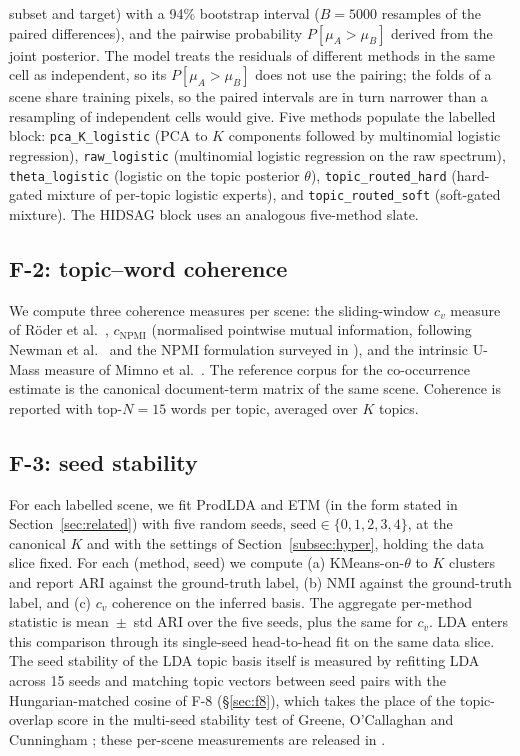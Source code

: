 \documentclass[journal,a4paper,10pt]{IEEEtran}
\begin{document}
subset and target) with a 94\% bootstrap interval ($B = 5000$ resamples
of the paired differences), and the pairwise probability
$P[\mu_A > \mu_B]$ derived from the joint posterior. The model treats
the residuals of different methods in the same cell as independent, so
its $P[\mu_A > \mu_B]$ does not use the pairing; the folds of a scene
share training pixels, so the paired intervals are in turn narrower
than a resampling of independent cells would give. Five methods
populate the labelled block: \texttt{pca\_K\_logistic} (PCA to $K$
components followed by multinomial logistic regression),
\texttt{raw\_logistic} (multinomial logistic regression on the raw
spectrum), \texttt{theta\_logistic} (logistic on the topic posterior
$\theta$), \texttt{topic\_routed\_hard} (hard-gated mixture of
per-topic logistic experts), and \texttt{topic\_routed\_soft}
(soft-gated mixture). The HIDSAG block uses an analogous five-method
slate.

\subsection{F-2: topic--word coherence}

We compute three coherence measures per scene: the sliding-window
$c_v$ measure of Röder et al.\ \cite{roder2015exploring},
$c_{\text{NPMI}}$ (normalised pointwise mutual information,
following Newman et al.\ \cite{newman2010coherence} and the
NPMI formulation surveyed in \cite{roder2015exploring}), and the
intrinsic U-Mass measure of Mimno et al.\ \cite{mimno2011coherence}.
The reference corpus for the co-occurrence estimate is the
canonical document-term matrix of the same scene. Coherence is
reported with top-$N = 15$ words per topic, averaged over $K$
topics.

\subsection{F-3: seed stability}

For each labelled scene, we fit ProdLDA and ETM (in the form stated in
Section~\ref{sec:related}) with five random
seeds, $\text{seed} \in \{0, 1, 2, 3, 4\}$, at the canonical $K$ and
with the settings of Section~\ref{subsec:hyper}, holding the data slice
fixed. For each
(method, seed) we compute (a) KMeans-on-$\theta$ to $K$ clusters and
report ARI against the ground-truth label, (b) NMI against the
ground-truth label, and (c) $c_v$ coherence on the inferred basis.
The aggregate per-method statistic is mean~$\pm$~std ARI over the five
seeds, plus the same for $c_v$. LDA enters this comparison through its
single-seed head-to-head fit on the same data slice. The seed stability
of the LDA topic basis itself is measured by refitting LDA across 15
seeds and matching topic vectors between seed pairs with the
Hungarian-matched cosine of F-8 (\S\ref{sec:f8}), which takes the place
of the topic-overlap score in the multi-seed stability test of Greene,
O'Callaghan and Cunningham \cite{greene2014topics}; these per-scene
measurements are released in .
\end{document}
